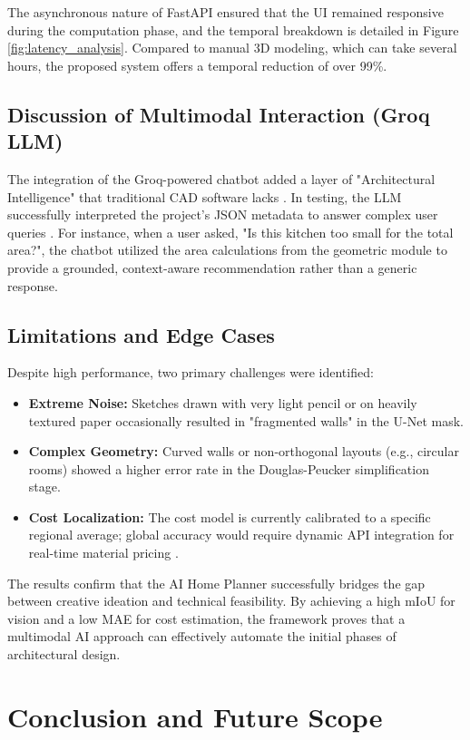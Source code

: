 \documentclass[10pt, conference, a4paper]{IEEEtran}
\begin{document}
The asynchronous nature of FastAPI ensured that the UI remained responsive during the computation phase, and the temporal breakdown is detailed in Figure \ref{fig:latency_analysis}. Compared to manual 3D modeling, which can take several hours, the proposed system offers a temporal reduction of over 99\%.

\subsection{Discussion of Multimodal Interaction (Groq LLM)}
The integration of the Groq-powered chatbot added a layer of "Architectural Intelligence" that traditional CAD software lacks \cite{15}. In testing, the LLM successfully interpreted the project's JSON metadata to answer complex user queries \cite{2}. For instance, when a user asked, "Is this kitchen too small for the total area?", the chatbot utilized the area calculations from the geometric module to provide a grounded, context-aware recommendation rather than a generic response.

\subsection{Limitations and Edge Cases}
Despite high performance, two primary challenges were identified:
\begin{itemize}[leftmargin=*]
    \item \textbf{Extreme Noise:} Sketches drawn with very light pencil or on heavily textured paper occasionally resulted in "fragmented walls" in the U-Net mask.
    \item \textbf{Complex Geometry:} Curved walls or non-orthogonal layouts (e.g., circular rooms) showed a higher error rate in the Douglas-Peucker simplification stage.
    \item \textbf{Cost Localization:} The cost model is currently calibrated to a specific regional average; global accuracy would require dynamic API integration for real-time material pricing \cite{6}.
\end{itemize}

The results confirm that the AI Home Planner successfully bridges the gap between creative ideation and technical feasibility. By achieving a high mIoU for vision and a low MAE for cost estimation, the framework proves that a multimodal AI approach can effectively automate the initial phases of architectural design.

\section{Conclusion and Future Scope}
\end{document}
